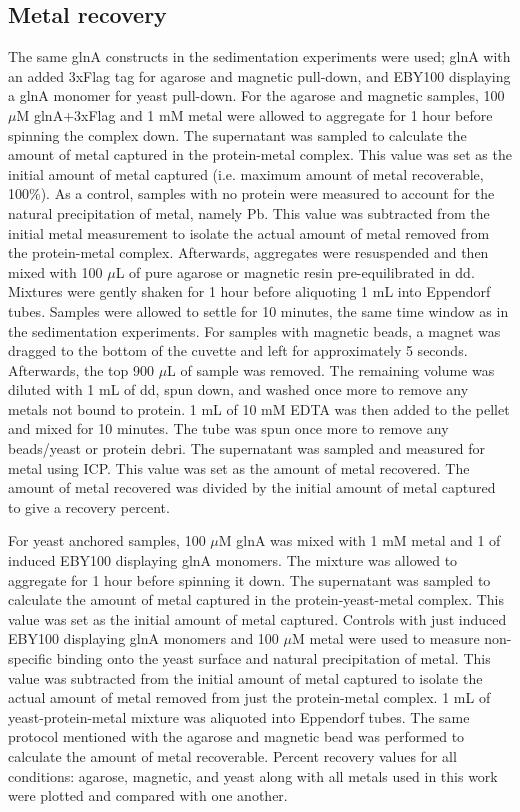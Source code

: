 \documentclass[../main/main]{subfiles}
\begin{document}
\subsection*{Metal recovery}
The same glnA constructs in the sedimentation experiments were used; glnA with an added 3xFlag tag for agarose and magnetic pull-down, and EBY100 displaying a glnA monomer for yeast pull-down. For the agarose and magnetic samples, 100 $\mu$M glnA+3xFlag and 1 mM metal were allowed to aggregate for 1 hour before spinning the complex down. The supernatant was sampled to calculate the amount of metal captured in the protein-metal complex. This value was set as the initial amount of metal captured (i.e. maximum amount of metal recoverable, 100\%). As a control, samples with no protein were measured to account for the natural precipitation of metal, namely Pb. This value was subtracted from the initial metal measurement to isolate the actual amount of metal removed from the protein-metal complex. Afterwards, aggregates were resuspended and then mixed with 100 $\mu$L of pure agarose or magnetic resin pre-equilibrated in dd. Mixtures were gently shaken for 1 hour before aliquoting 1 mL into Eppendorf tubes. Samples were allowed to settle for 10 minutes, the same time window as in the sedimentation experiments. For samples with magnetic beads, a magnet was dragged to the bottom of the cuvette and left for approximately 5 seconds. Afterwards, the top 900 $\mu$L of sample was removed. The remaining volume was diluted with 1 mL of dd, spun down, and washed once more to remove any metals not bound to protein. 1 mL of 10 mM EDTA was then added to the pellet and mixed for 10 minutes. The tube was spun once more to remove any beads/yeast or protein debri. The supernatant was sampled and measured for metal using ICP. This value was set as the amount of metal recovered. The amount of metal recovered was divided by the initial amount of metal captured to give a recovery percent.

For yeast anchored samples, 100 $\mu$M glnA was mixed with 1 mM metal and 1 \OD of induced EBY100 displaying glnA monomers. The mixture was allowed to aggregate for 1 hour before spinning it down. The supernatant was sampled to calculate the amount of metal captured in the protein-yeast-metal complex. This value was set as the initial amount of metal captured. Controls with just induced EBY100 displaying glnA monomers and 100 $\mu$M metal were used to measure non-specific binding onto the yeast surface and natural precipitation of metal. This value was subtracted from the initial amount of metal captured to isolate the actual amount of metal removed from just the protein-metal complex. 1 mL of yeast-protein-metal mixture was aliquoted into Eppendorf tubes. The same protocol mentioned with the agarose and magnetic bead was performed to calculate the amount of metal recoverable. Percent recovery values for all conditions: agarose, magnetic, and yeast along with all metals used in this work were plotted and compared with one another.
\end{document}
